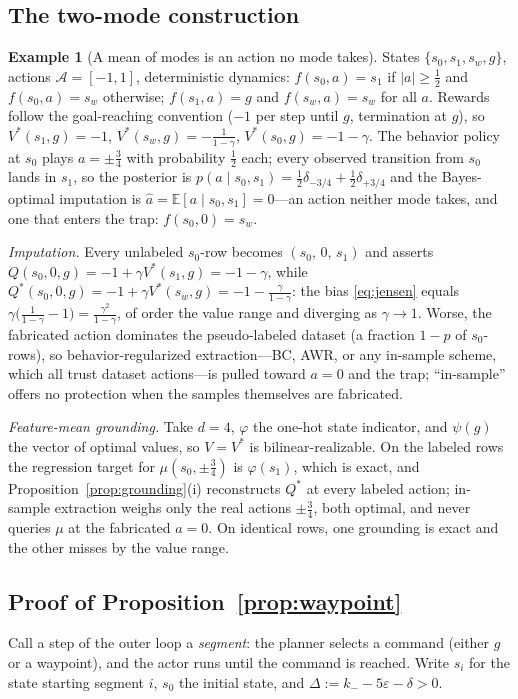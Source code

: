 \documentclass{article}
\newcommand{\E}{\mathbb{E}}
\theoremstyle{plain}
\theoremstyle{definition}
\newtheorem{example}{Example}
\begin{document}
\subsection{The two-mode construction}
\begin{example}[A mean of modes is an action no mode takes]
\label{ex:modes}
States $\{s_0,s_1,s_w,g\}$, actions $\mathcal A=[-1,1]$, deterministic dynamics: $f(s_0,a)=s_1$ if $|a|\ge\tfrac12$ and $f(s_0,a)=s_w$ otherwise; $f(s_1,a)=g$ and $f(s_w,a)=s_w$ for all $a$. Rewards follow the goal-reaching convention ($-1$ per step until $g$, termination at $g$), so $V^\ast(s_1,g)=-1$, $V^\ast(s_w,g)=-\tfrac1{1-\gamma}$, $V^\ast(s_0,g)=-1-\gamma$. The behavior policy at $s_0$ plays $a=\pm\tfrac34$ with probability $\tfrac12$ each; every observed transition from $s_0$ lands in $s_1$, so the posterior is $p(a\mid s_0,s_1)=\tfrac12\delta_{-3/4}+\tfrac12\delta_{+3/4}$ and the Bayes-optimal imputation is $\hat a=\E[a\mid s_0,s_1]=0$---an action neither mode takes, and one that enters the trap: $f(s_0,0)=s_w$.

\emph{Imputation.} Every unlabeled $s_0$-row becomes $(s_0,\,0,\,s_1)$ and asserts $Q(s_0,0,g)=-1+\gamma V^\ast(s_1,g)=-1-\gamma$, while $Q^\ast(s_0,0,g)=-1+\gamma V^\ast(s_w,g)=-1-\tfrac{\gamma}{1-\gamma}$: the bias \eqref{eq:jensen} equals $\gamma\big(\tfrac1{1-\gamma}-1\big)=\tfrac{\gamma^2}{1-\gamma}$, of order the value range and diverging as $\gamma\to1$. Worse, the fabricated action dominates the pseudo-labeled dataset (a fraction $1-p$ of $s_0$-rows), so behavior-regularized extraction---BC, AWR, or any in-sample scheme, which all trust dataset actions---is pulled toward $a=0$ and the trap; ``in-sample'' offers no protection when the samples themselves are fabricated.

\emph{Feature-mean grounding.} Take $d=4$, $\varphi$ the one-hot state indicator, and $\psi(g)$ the vector of optimal values, so $V=V^\ast$ is bilinear-realizable. On the labeled rows the regression target for $\mu(s_0,\pm\tfrac34)$ is $\varphi(s_1)$, which is exact, and Proposition~\ref{prop:grounding}(i) reconstructs $Q^\ast$ at every labeled action; in-sample extraction weighs only the real actions $\pm\tfrac34$, both optimal, and never queries $\mu$ at the fabricated $a=0$. On identical rows, one grounding is exact and the other misses by the value range.
\end{example}

\subsection{Proof of Proposition~\ref{prop:waypoint}}
Call a step of the outer loop a \emph{segment}: the planner selects a command (either $g$ or a waypoint), and the actor runs until the command is reached. Write $s_i$ for the state starting segment $i$, $s_0$ the initial state, and $\Delta:=k_--5\varepsilon-\delta>0$.
\end{document}
